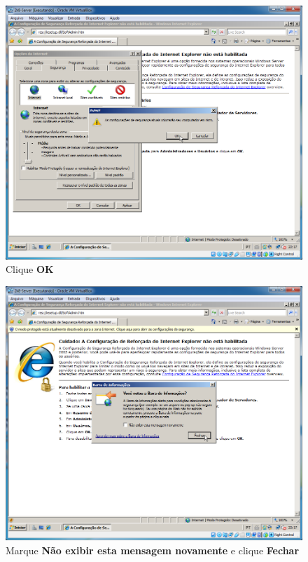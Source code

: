 \documentclass[10pt]{article}
\begin{document}
\begin{figure}[H]
    \centering
    \caption{Clique \textbf{OK}}
    \label{fig:re043}
    \includegraphics[width=\linewidth]{images/rede_externa/re043.png}
\end{figure}
\begin{figure}[H]
    \centering
    \caption{Marque \textbf{Não exibir esta mensagem novamente} e clique \textbf{Fechar}}
    \label{fig:re044}
    \includegraphics[width=\linewidth]{images/rede_externa/re044.png}
\end{figure}
\end{document}
